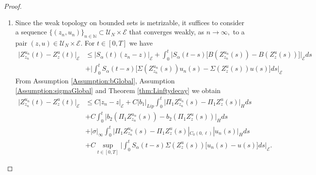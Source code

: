 \documentclass[10pt, reqno]{amsart}
\newcommand{\N}{\mathbb{N}}
\newcommand{\e}{\mathcal{E}}
\theoremstyle{definition}
\numberwithin{lem}{section}
\numberwithin{cor}{section}
\numberwithin{prop}{section}
\numberwithin{thm}{section}
\numberwithin{dfn}{section}
\begin{document}
\begin{proof}
\begin{enumerate}
Thus, by Sobolev embedding we have 
\begin{equation}\label{eq:skeletonBound}
\begin{aligned}
&\sup_{t\leq T}\big|Z^{u}_{z}(t)\big|^2_{\mathcal{E}}\leq 2\sup_{t\leq T}\big|\Pi_1Z^{u}_{z}(t)\big|^2_{\infty}+2\sup_{t\leq T}\big|\partial_t\Pi_1Z^{u}_{z}(t)\big|^2_{C^{-1}}\\&\leq C\bigg(\sup_{t\leq T}\big|\rho(t)\big|^2_{H^1}+\sup_{t\leq T}\big|\partial_t\rho(t)\big|^2_{H}\bigg)+
\sup_{t\leq T}\big|\Pi_1S_\alpha(t)z\big|^2_{\infty}+\sup_{t\leq T}\big|\Pi_2S_\alpha(t)z\big|^2_{C^{-1}}\\&
\leq C\bigg[T(1+|z|^{2\lambda}_{\e})+|\sigma|^2_\infty N\bigg]\exp\big(cT|z|^2_\mathcal{E}\big)+C |z|^2_{\e}.
\end{aligned}
\end{equation}
The proof is complete.
    \item 
	Since the weak topology on bounded sets is metrizable, it suffices to consider a sequence $\{(z_n, u_n)\}_{n\in\N}\subset\mathcal{U}_N\times\e$ that converges weakly, as $n\to\infty,$ to a pair $(z, u)\in\mathcal{U}_N\times\e.$ For $t\in[0,T]$ we have 
\begin{equation*}
\begin{aligned}
|Z^{u_n}_{z_n}(t)-Z^{u}_{z}(t)\big|_{\e}&\leq \big| S_\alpha(t)(z_n-z)\big|_{\e}+\int_{0}^{t}\bigg| S_\alpha(t-s)\big[B(Z^{u_n}_{z_n}(s))- B(Z^{u}_{z}(s))\big]\bigg|_{\e}ds\\&
+\bigg|\int_{0}^{t} S_\alpha(t-s)\big[\Sigma(Z^{u_n}_{z_n}(s))u_n(s)- \Sigma(Z^{u}_{z}(s))u(s)\big]ds\bigg|_{\e}
\end{aligned}
\end{equation*}
From Assumption \ref{Assumption:bGlobal}, Assumption \ref{Assumption:sigmaGlobal} and Theorem \ref{thm:Linftydecay} we obtain 
\begin{equation}\label{Zcontbnd1Global}
\begin{aligned}
|Z^{u_n}_{z_n}(t)-Z^{u}_{z}(t)\big|_{\e}&
\leq C| z_n-z|_{\e}+C|b_1|_{Lip}\int_{0}^{t}\big|\Pi_1Z^{u_n}_{z_n}(s)-\Pi_1Z^{u}_{z}(s)|_{H}ds\\&+C\int_{0}^{t} \big|b_2(\Pi_1Z^{u_n}_{z_n}(s))- b_2(\Pi_1Z^{u}_{z}(s))\big|_{H}ds\\&
+|\sigma|_{\infty}\int_{0}^{t}\big|\Pi_1Z^{u_n}_{z_n}(s)-\Pi_1Z^{u}_{z}(s)|_{C_0(0,\ell)}|u_n(s)|_{H}ds\\&
+C\sup_{t\in[0,T]}\bigg|\int_{0}^{t}S_\alpha(t-s) \Sigma(Z^{u}_{z}(s))\big[u_n(s)-u(s)\big]ds\bigg|_{\e}.
\end{aligned}
\end{equation}


\end{enumerate}
\end{proof}
\end{document}
